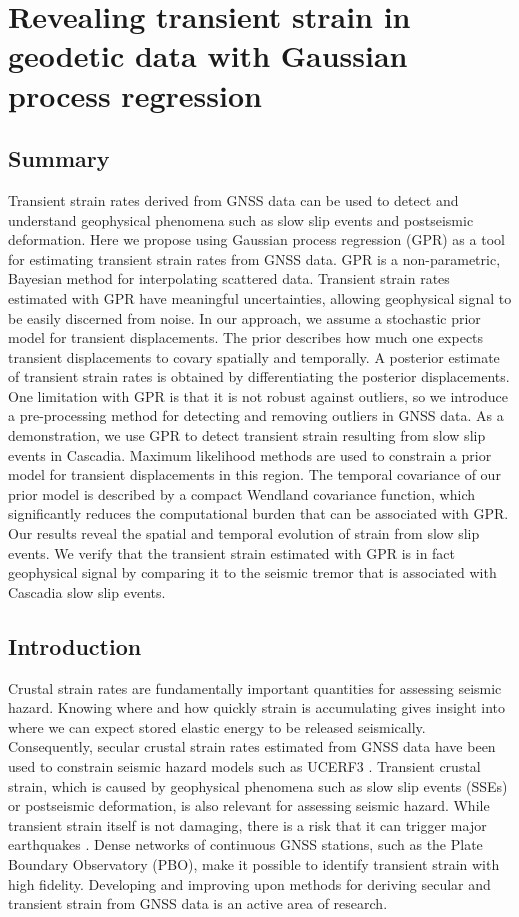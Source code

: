 \chapter{Revealing transient strain in geodetic data with Gaussian process regression}

\section{Summary}
Transient strain rates derived from GNSS data can be used to detect and understand geophysical phenomena such as slow slip events and postseismic deformation. Here we propose using Gaussian process regression (GPR) as a tool for estimating transient strain rates from GNSS data. GPR is a non-parametric, Bayesian method for interpolating scattered data. Transient strain rates estimated with GPR have meaningful uncertainties, allowing geophysical signal to be easily discerned from noise. In our approach, we assume a stochastic prior model for transient displacements. The prior describes how much one expects transient displacements to covary spatially and temporally. A posterior estimate of transient strain rates is obtained by differentiating the posterior displacements. One limitation with GPR is that it is not robust against outliers, so we introduce a pre-processing method for detecting and removing outliers in GNSS data. As a demonstration, we use GPR to detect transient strain resulting from slow slip events in Cascadia. Maximum likelihood methods are used to constrain a prior model for transient displacements in this region. The temporal covariance of our prior model is described by a compact Wendland covariance function, which significantly reduces the computational burden that can be associated with GPR. Our results reveal the spatial and temporal evolution of strain from slow slip events. We verify that the transient strain estimated with GPR is in fact geophysical signal by comparing it to the seismic tremor that is associated with Cascadia slow slip events.

\section{Introduction}\label{ch5:sec:Introduction}
Crustal strain rates are fundamentally important quantities for assessing seismic hazard. Knowing where and how quickly strain is accumulating gives insight into where we can expect stored elastic energy to be released seismically. Consequently, secular crustal strain rates estimated from GNSS data have been used to constrain seismic hazard models such as UCERF3 \citep{Field2014}. Transient crustal strain, which is caused by geophysical phenomena such as slow slip events (SSEs) or postseismic deformation, is also relevant for assessing seismic hazard. While transient strain itself is not damaging, there is a risk that it can trigger major earthquakes \citep{Roeloffs2006,Freed2001}. Dense networks of continuous GNSS stations, such as the Plate Boundary Observatory (PBO), make it possible to identify transient strain with high fidelity. Developing and improving upon methods for deriving secular and transient strain from GNSS data is an active area of research.


